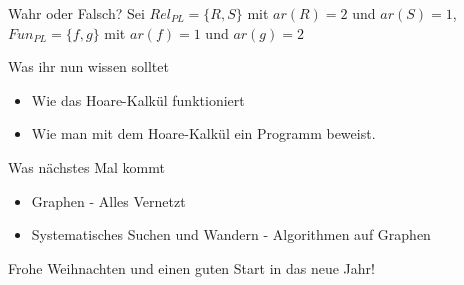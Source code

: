 \begin{frame}{Wahr oder Falsch?}
	Sei $Rel_{PL} = \{R,S\}$ mit $ar(R) = 2$ und $ar(S) = 1$, \\
	$Fun_{PL} = \{f,g\}$ mit $ar(f) = 1$ und $ar(g) = 2$ 
\end{frame}






\begin{frame}	
	\begin{block}{Was ihr nun wissen solltet}
		\begin{itemize}
			\item Wie das Hoare-Kalkül funktioniert
			\item Wie man mit dem Hoare-Kalkül ein Programm beweist.
		\end{itemize}
	\end{block}
	
	\begin{block}{Was nächstes Mal kommt}
		\begin{itemize}
			\item Graphen - Alles Vernetzt
			\item Systematisches Suchen und Wandern - Algorithmen auf Graphen
		\end{itemize}
	\end{block}
\end{frame}

\begin{frame}
	\Large
	\centering
	Frohe Weihnachten und einen guten Start in das neue Jahr!
\end{frame}

\slideThanks

